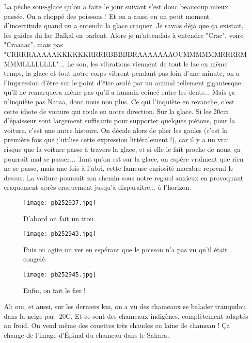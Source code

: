 \documentclass{book}
\begin{document}
La pêche sous-glace qu'on a faite le jour suivant s'est donc beaucoup mieux passée. On a choppé des poissons ! Et on a aussi eu un petit moment d'incertitude quand on a entendu la glace craquer. Je savais déjà que ça existait, les guides du lac Baïkal en parlent. Alors je m'attendais à entendre "Crac", voire "Craaaac", mais pas "CRRRRAAAAAKKKKKKRRRRBBBBBRAAAAAAAOUMMMMMMRRRRMMMMLLLLLLLL"... Le son, les vibrations viennent de tout le lac en même temps, la glace et tout notre corps vibrent pendant pas loin d'une minute, on a l'impression d'être sur le point d'être avalé par un animal tellement gigantesque qu'il ne remarquera même pas qu'il a humain coincé entre les dents...
Mais ça n'inquiète pas Naraa, donc nous non plus. Ce qui l'inquiète en revanche, c'est cette idiote de voiture qui roule en notre direction. Sur la glace. Si les 20cm d'épaisseur sont largement suffisants pour supporter quelques piétons, pour la voiture, c'est une autre histoire. On décide alors de plier les gaules (c'est la première fois que j'utilise cette expression littéralement !), car il y a un vrai risque que la voiture passe à travers la glace, et si elle le fait proche de nous, ça pourrait mal se passer... Tant qu'on est sur la glace, on espère vraiment que rien ne se passe, mais une fois à l'abri, cette fameuse curiosité macabre reprend le dessus. La voiture poursuit son chemin sous notre regard anxieux en provoquant craquement après craquement jusqu'à disparaitre... à l'horizon.


\begin{figure}[h]
\centering
\texttt{[image: pb252937.jpg]}
\caption*{ D'abord on fait un trou.}
\end{figure}


\begin{figure}[h]
\centering
\texttt{[image: pb252943.jpg]}
\caption*{ Puis on agite un ver en espérant que le poisson n'a pas vu qu'il était congelé.}
\end{figure}


\begin{figure}[h]
\centering
\texttt{[image: pb252945.jpg]}
\caption*{ Enfin, on fait le fier !}
\end{figure}

Ah oui, et aussi, sur les derniers km, on a vu des chameaux se balader tranquilou dans la neige par -20\textdegree C. Et ce sont des chameaux indigènes, complètement adaptés au froid. On vend même des couettes très chaudes en laine de chameau ! Ça change de l'image d’Épinal du chameau dans le Sahara.
\end{document}
